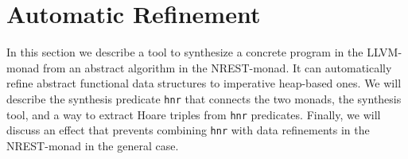 \documentclass[acmsmall]{acmart}
\newcommand{\is}{\lstinline[language=isabelle]}
\begin{document}
  


      

    
\clearpage
\section{Automatic Refinement} \label{sec:sepref}

In this section we describe a tool to synthesize a concrete program in the LLVM-monad from an abstract algorithm in the NREST-monad. It can automatically refine abstract functional data structures to imperative heap-based ones.
We will describe the synthesis predicate \is{hnr} that connects the two monads, the synthesis tool, and a way to extract Hoare triples from \is{hnr} predicates.
%
Finally, we will discuss an effect that prevents combining \is{hnr} with data refinements in the NREST-monad in the general case.
\end{document}
